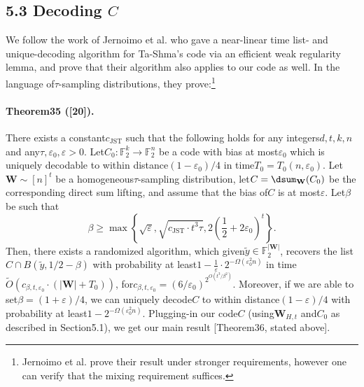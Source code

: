 \subsection*{5.3 Decoding $C$}
We follow the work of Jernoimo et al. who gave a near-linear time list- and unique-decoding algorithm for Ta-Shma's code via an efficient weak regularity lemma, and prove that their algorithm also applies to our code as well. In the language of$\tau$-sampling distributions, they prove:\footnote{Jernoimo et al. prove their result under stronger requirements, however one can verify that the mixing requirement suffices.}
\paragraph{Theorem35 ([20]).} There exists a constant$c_{\mathrm{JST}}$ such that the following holds for any integers$d,t,k,n$ and any$\tau,\varepsilon_0,\varepsilon>0$. Let$C_0:\mathbb F_2^k\to\mathbb F_2^n$ be a code with bias at most$\varepsilon_0$ which is uniquely decodable to within distance$(1-\varepsilon_0)/4$ in time$T_0=T_0(n,\varepsilon_0)$. Let$\mathbf W\sim[n]^t$ be a homogeneous$\tau$-sampling distribution, let$C=\dsum_{\mathbf W}(C_0)$ be the corresponding direct sum lifting, and assume that the bias of$C$ is at most$\varepsilon$. Let$\beta$ be such that
\[\beta\geq\max\left\{\sqrt\varepsilon,\sqrt{c_{\mathrm{JST}}\cdot t^3\tau},2\left(\frac12+2\varepsilon_0\right)^t\right\}.\]
Then, there exists a randomized algorithm, which given$\tilde y\in\mathbb F_2^{|\mathbf W|}$, recovers the list$C\cap B(\tilde y,1/2-\beta)$ with probability at least$1-\frac1\varepsilon\cdot2^{-\Omega(\varepsilon_0^2n)}$ in time$\widetilde O(c_{\beta,t,\varepsilon_0}\cdot(|\mathbf W|+T_0))$, for$c_{\beta,t,\varepsilon_0}=(6/\varepsilon_0)^{2^{O(t^3/\beta^2)}}$. Moreover, if we are able to set$\beta=(1+\varepsilon)/4$, we can uniquely decode$C$ to within distance$(1-\varepsilon)/4$ with probability at least$1-2^{-\Omega(\varepsilon_0^2n)}$.
Plugging-in our code$C$ (using$\mathbf W_{H,t}$ and$C_0$ as described in Section5.1), we get our main result [Theorem36, stated above].

